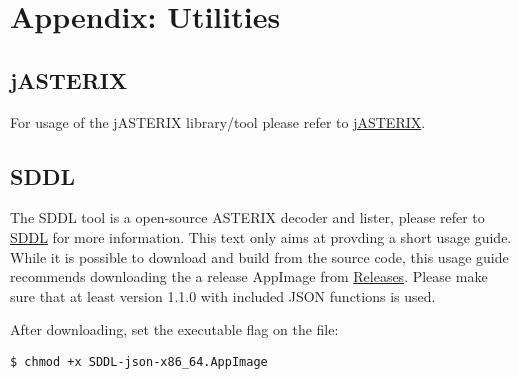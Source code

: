 \section{Appendix: Utilities}
\label{sec:appendix_utils}

\subsection{jASTERIX}
\label{sec:jasterix}

For usage of the jASTERIX library/tool please refer to \href{https://github.com/hpuhr/jASTERIX}{jASTERIX}.

\subsection{SDDL}
\label{sec:sddl}

The SDDL tool is a open-source ASTERIX decoder and lister, please refer to \href{https://github.com/kobelbauer/sddl/}{SDDL} for more information. This text only aims at provding a short usage guide.\\

While it is possible to download and build from the source code, this usage guide recommends downloading the a release AppImage from \href{https://github.com/kobelbauer/sddl/releases}{Releases}. Please make sure that at least version 1.1.0 with included JSON functions is used.

After downloading, set the executable flag on the file: 

\begin{lstlisting}
$ chmod +x SDDL-json-x86_64.AppImage
\end{lstlisting}


